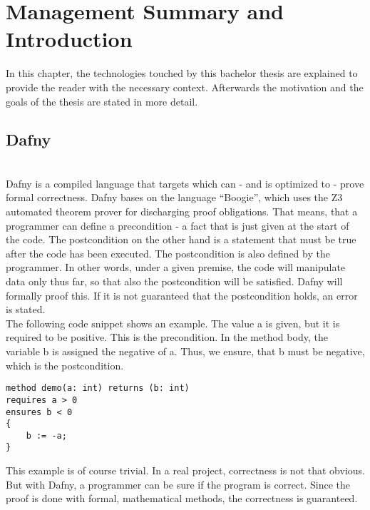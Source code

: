 \section{Management Summary and Introduction}
\label{section:introduction}
In this chapter, the technologies touched by this bachelor thesis are explained to provide the reader with the necessary context.
Afterwards the motivation and the goals of the thesis are stated in more detail.

\subsection{Dafny}
\label{section:introduction:dafny}
 \\
Dafny is a compiled language that targets \Csharp which can - and is optimized to - prove formal correctness.\cite{dafnyWiki} Dafny bases on the language “Boogie”, which uses the Z3 automated theorem prover for discharging proof obligations.\cite{dafnyWiki} That means, that a programmer can define a precondition - a fact that is just given at the start of the code.
The postcondition on the other hand is a statement that must be true after the code has been executed.
The postcondition is also defined by the programmer.
In other words, under a given premise, the code will manipulate data only thus far, so that also the postcondition will be satisfied.
Dafny will formally proof this.
If it is not guaranteed that the postcondition holds, an error is stated.\\

The following code snippet shows an example.
The value a is given, but it is required to be positive.
This is the precondition.
In the method body, the variable b is assigned the negative of a.
Thus, we ensure, that b must be negative, which is the postcondition.
\begin{lstlisting}[language=dafny, caption={Simple Dafny Example}, captionpos=b, label={lst:simpleDafnyExample}]
method demo(a: int) returns (b: int)
requires a > 0
ensures b < 0
{
    b := -a;
}
\end{lstlisting}
This example is of course trivial.
In a real project, correctness is not that obvious.
But with Dafny, a programmer can be sure if the program is correct.
Since the proof is done with formal, mathematical methods, the correctness is guaranteed.\\

